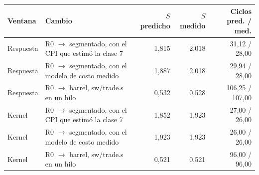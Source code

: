 \begin{tabular}{llrrr}
\toprule
Ventana & Cambio & $S$ predicho & $S$ medido & Ciclos pred. / med. \\
\midrule
Respuesta & R0 $\to$ segmentado, con el CPI que estimó la clase 7 & 1{,}815 & 2{,}018 & 31{,}12 / 28{,}00 \\
Respuesta & R0 $\to$ segmentado, con el modelo de costo medido & 1{,}887 & 2{,}018 & 29{,}94 / 28{,}00 \\
Respuesta & R0 $\to$ barrel, sw/trade.s en un hilo & 0{,}532 & 0{,}528 & 106{,}25 / 107{,}00 \\
Kernel & R0 $\to$ segmentado, con el CPI que estimó la clase 7 & 1{,}852 & 1{,}923 & 27{,}00 / 26{,}00 \\
Kernel & R0 $\to$ segmentado, con el modelo de costo medido & 1{,}923 & 1{,}923 & 26{,}00 / 26{,}00 \\
Kernel & R0 $\to$ barrel, sw/trade.s en un hilo & 0{,}521 & 0{,}521 & 96{,}00 / 96{,}00 \\
\bottomrule
\end{tabular}
\par{}
